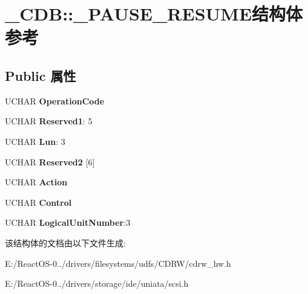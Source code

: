 \hypertarget{struct___c_d_b_1_1___p_a_u_s_e___r_e_s_u_m_e}{}\section{\+\_\+\+C\+DB\+:\+:\+\_\+\+P\+A\+U\+S\+E\+\_\+\+R\+E\+S\+U\+M\+E结构体 参考}
\label{struct___c_d_b_1_1___p_a_u_s_e___r_e_s_u_m_e}
\subsection*{Public 属性}
\begin{DoxyCompactItemize}
\item 
\mbox{\label{struct___c_d_b_1_1___p_a_u_s_e___r_e_s_u_m_e_af11e6134628ea048497ff9f1004865fc}} 
U\+C\+H\+AR {\bfseries Operation\+Code}
\item 
\mbox{\label{struct___c_d_b_1_1___p_a_u_s_e___r_e_s_u_m_e_a5f28208d8e603b86ec4c1303b1fcfe4b}} 
U\+C\+H\+AR {\bfseries Reserved1}\+: 5
\item 
\mbox{\label{struct___c_d_b_1_1___p_a_u_s_e___r_e_s_u_m_e_ade902b342f6104e7d14a917d18c5d0a9}} 
U\+C\+H\+AR {\bfseries Lun}\+: 3
\item 
\mbox{\label{struct___c_d_b_1_1___p_a_u_s_e___r_e_s_u_m_e_a3e3b3f1a1e820a20f488484c41dca33c}} 
U\+C\+H\+AR {\bfseries Reserved2} \mbox{[}6\mbox{]}
\item 
\mbox{\label{struct___c_d_b_1_1___p_a_u_s_e___r_e_s_u_m_e_ae02b2e4f4d24949c93eab51ea50589ec}} 
U\+C\+H\+AR {\bfseries Action}
\item 
\mbox{\label{struct___c_d_b_1_1___p_a_u_s_e___r_e_s_u_m_e_a1b057711b6f1053f6123f05b2188c4f2}} 
U\+C\+H\+AR {\bfseries Control}
\item 
\mbox{\label{struct___c_d_b_1_1___p_a_u_s_e___r_e_s_u_m_e_a26eff8885e6ef747f20102d03c1f41ba}} 
U\+C\+H\+AR {\bfseries Logical\+Unit\+Number}\+:3
\end{DoxyCompactItemize}


该结构体的文档由以下文件生成\+:\begin{DoxyCompactItemize}
\item 
E\+:/\+React\+O\+S-\/0../drivers/filesystems/udfs/\+C\+D\+R\+W/cdrw\+\_\+hw.\+h\item 
E\+:/\+React\+O\+S-\/0../drivers/storage/ide/uniata/scsi.\+h\end{DoxyCompactItemize}
